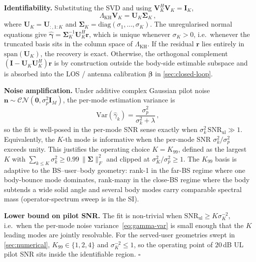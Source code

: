 \documentclass[journal,twocolumn,10pt]{IEEEtran}
\theoremstyle{plain}
\theoremstyle{definition}
\theoremstyle{remark}
\newcommand{\betab}{\bm{\beta}}
\newcommand{\gammab}{\bm{\gamma}}
\begin{document}
\textbf{Identifiability.} Substituting the SVD and using
$\bm{V}_K^{\!H}\bm{V}_K = \bm{I}_K$,
\begin{equation}\label{eq:Fb-Vk}
  \Lambda_{\mathrm{KH}}\bm{V}_K = \bm{U}_K\bm{\Sigma}_K\,,
\end{equation}
where $\bm{U}_K = \bm{U}_{:,1:K}$ and
$\bm{\Sigma}_K = \mathrm{diag}(\sigma_1,\dots,\sigma_K)$. The
unregularised normal equations give
$\hat{\gammab} = \bm{\Sigma}_K^{-1}\bm{U}_K^{\!H}\bm{r}$, which is
unique whenever $\sigma_K > 0$, i.e.~whenever the truncated basis
sits in the column space of $\Lambda_{\mathrm{KH}}$. If the residual
$\bm{r}$ lies entirely in $\mathrm{span}(\bm{U}_K)$, the recovery is
exact. Otherwise, the orthogonal complement
$(\bm{I}-\bm{U}_K\bm{U}_K^{\!H})\bm{r}$ is by construction outside
the body-side estimable subspace and is absorbed into the
LOS / antenna calibration $\betab$ in
\cref{sec:closed-loop}.

\textbf{Noise amplification.} Under additive complex Gaussian pilot
noise $\bm{n} \sim \mathcal{CN}(\bm{0},\sigma_p^2 \bm{I}_M)$,
the per-mode estimation variance is
\begin{equation}\label{eq:gamma-var}
  \mathrm{Var}(\hat\gamma_k)
    = \frac{\sigma_p^2}{\sigma_k^2 + \lambda}\,,
\end{equation}
so the fit is well-posed in the per-mode SNR
sense exactly when $\sigma_k^2 \,\mathrm{SNR}_{\mathrm{ul}}\gg 1$.
Equivalently, the $K$-th mode is informative when the per-mode SNR
$\sigma_k^2/\sigma_p^2$ exceeds unity. This justifies the operating
choice $K = K_{99}$, defined as the largest $K$ with
$\sum_{k\leq K}\sigma_k^2 \geq 0.99\,\|\bm{\Sigma}\|_F^2$ and
clipped at $\sigma_K^2 / \sigma_p^2 \geq 1$. The $K_{99}$ basis is
adaptive to the BS--user--body geometry: rank-1 in the far-BS regime
where one body-bounce mode dominates, rank-many in the close-BS
regime where the body subtends a wide solid angle and several body
modes carry comparable spectral mass (operator-spectrum sweep is in
the SI).

\textbf{Lower bound on pilot SNR.} The fit is non-trivial when
$\mathrm{SNR}_{\mathrm{ul}} \geq K\sigma_K^{-2}$, i.e.~when the
per-mode noise variance~\eqref{eq:gamma-var} is small enough that
the $K$ leading modes are jointly resolvable. For the served-user
geometries swept in \cref{sec:numerical}, $K_{99} \in \{1, 2, 4\}$
and $\sigma_K^{-2} \leq 1$, so the operating point of
$20\,$dB UL pilot SNR sits inside the identifiable
region. \hfill$\square$
\end{document}
